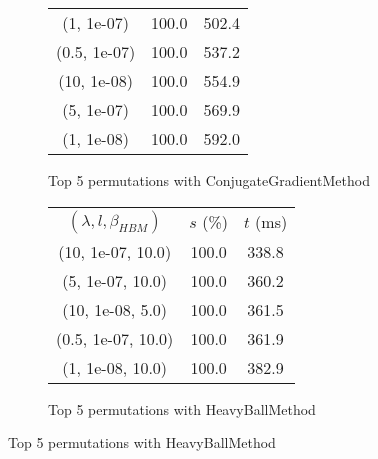 \begin{figure}[H]
\begin{subfigure}[ht]{.5\textwidth}
\begin{tabular}{|c|c|c|}
\hline
(1, 1e-07) & 100.0 & 502.4 \\
(0.5, 1e-07) & 100.0 & 537.2 \\
(10, 1e-08) & 100.0 & 554.9 \\
(5, 1e-07) & 100.0 & 569.9 \\
(1, 1e-08) & 100.0 & 592.0 \\
\hline
\end{tabular}
\caption{Top 5 permutations with ConjugateGradientMethod}
\label{subfig:param_comp_MatrixSquareSum_ConjugateGradientMethod_NewtonsSearch}
\end{subfigure}
\hfill
\begin{subfigure}[ht]{.5\textwidth}
\begin{tabular}{|c|c|c|}
\hline
\rowcolor{gray!25}
\multicolumn{3}{|c|}{HeavyBallMethod} \\
\hline
\rowcolor{gray!25}
$(\lambda,l,\beta_{HBM})$ & $s$ (\%) & $t$ (ms) \\
\hline
(10, 1e-07, 10.0) & 100.0 & 338.8 \\
(5, 1e-07, 10.0) & 100.0 & 360.2 \\
(10, 1e-08, 5.0) & 100.0 & 361.5 \\
(0.5, 1e-07, 10.0) & 100.0 & 361.9 \\
(1, 1e-08, 10.0) & 100.0 & 382.9 \\
\hline
\end{tabular}
\caption{Top 5 permutations with HeavyBallMethod}
\label{subfig:param_comp_MatrixSquareSum_HeavyBallMethod_NewtonsSearch}
\end{subfigure}
\end{figure}

